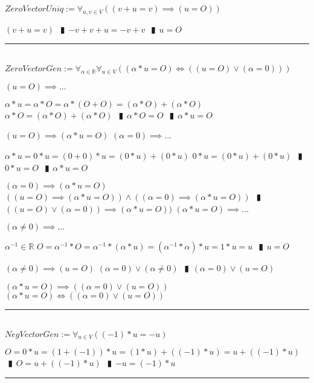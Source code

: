 \documentclass{book}
\newcommand{\abr}{:=}
\newcommand{\pipe}{$\phantom{(}\vrectangleblack\phantom{)}$}
\begin{document}
$ZeroVectorUniq \abr \forall_{u, v \in V}((v + u = v) \implies (u = O))$
\begin{enumerate}
  \lit $(v + u = v)$ \pipe $-v + v + u = -v + v$ \pipe $u = O$
\end{enumerate} \vspace{.75mm} \hrule \vspace{.75mm} \ \\ 

$ZeroVectorGen \abr \forall_{\alpha \in \mathbb{R}} \forall_{u \in V}((\alpha * u = O) \iff ((u = O) \lor (\alpha = 0)))$
\begin{enumerate}
  \lit $(u = O) \implies \ldots$
  \begin{enumerate}
    \lit $\alpha * u = \alpha * O = \alpha * (O + O) = (\alpha * O) + (\alpha * O)$
    \lit $\alpha * O = (\alpha * O) + (\alpha * O)$ \pipe $\alpha * O = O$ \pipe $\alpha * u = O$
  \end{enumerate}
  \lit $(u = O) \implies (\alpha * u = O)$
  \lit $(\alpha = 0) \implies \ldots$
  \begin{enumerate}
    \lit $\alpha * u = 0 * u = (0 + 0) * u = (0 * u )+ (0 * u)$
    \lit $0 * u = (0 * u )+ (0 * u)$ \pipe $0 * u = O$ \pipe $\alpha * u = O$
  \end{enumerate}
  \lit $(\alpha = 0) \implies (\alpha * u = O)$
  \lit $((u = O) \implies (\alpha * u = O)) \land ((\alpha = 0) \implies (\alpha * u = O))$ \pipe $((u = O) \lor (\alpha = 0)) \implies (\alpha * u = O))$
  \lit $(\alpha * u = O) \implies \ldots$
  \begin{enumerate}
    \lit $(\alpha \neq 0) \implies \ldots$
      \begin{enumerate}
        \lit $\alpha^{-1} \in \mathbb{R}$
        \lit $O = \alpha^{-1} * O = \alpha^{-1} * (\alpha * u) = (\alpha^{-1} * \alpha) * u = 1 * u = u$ \pipe $u = O$
      \end{enumerate}
      \lit $(\alpha \neq 0) \implies (u = O)$
      \lit $(\alpha = 0) \lor (\alpha \neq 0)$ \pipe $(\alpha = 0) \lor (u = O)$
  \end{enumerate}
  \lit $(\alpha * u = O) \implies ((\alpha = 0) \lor (u = O))$
  \lit $(\alpha * u = O) \iff ((\alpha = 0) \lor (u = O))$
\end{enumerate} \vspace{.75mm} \hrule \vspace{.75mm} \ \\ 

$NegVectorGen \abr \forall_{u \in V}((-1) * u = -u)$
\begin{enumerate}
  \lit $O = 0 * u = (1 + (-1)) * u = (1 * u) + ((-1) * u) = u + ((-1) * u)$ \pipe $O = u + ((-1) * u)$ \pipe $-u = (-1) * u$
\end{enumerate} \vspace{.75mm} \hrule \vspace{.75mm} \ \\ 
\end{document}
